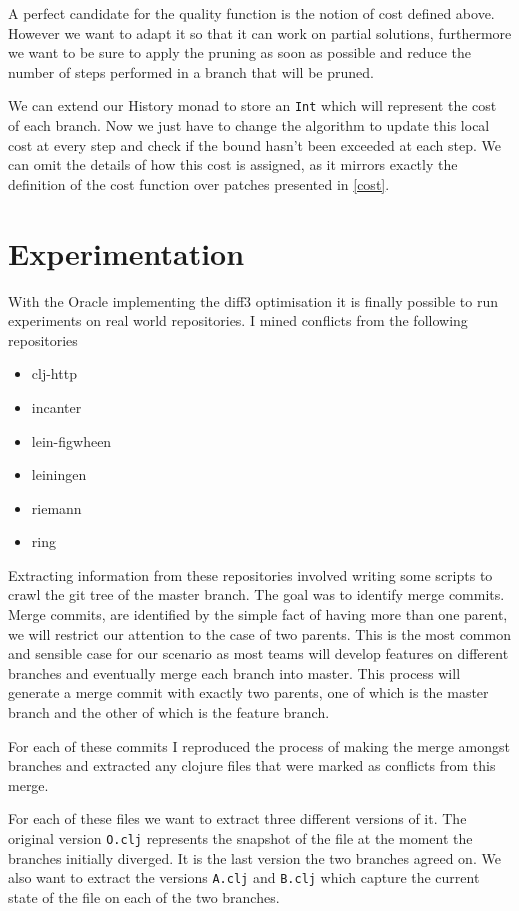 \documentclass[11pt]{article}
\begin{document}
A perfect candidate for the quality function is the notion of cost defined 
above. However we want to adapt it so that it can work on partial solutions, 
furthermore we want to be sure to apply the pruning as soon as possible and 
reduce the number of steps performed in a branch that will be pruned.

We can extend our History monad to store an \texttt{Int} which will represent 
the cost of each branch. Now we just have to change the algorithm to update this 
local cost at every step and check if the bound hasn't been exceeded at each 
step. We can omit the details of how this cost is assigned, as it mirrors 
exactly the definition of the cost function over patches presented in 
\ref{cost}. 


\section{Experimentation}
With the Oracle implementing the diff3 optimisation it is finally possible to
run experiments on real world repositories. I mined conflicts from the following
repositories
 \begin{itemize}
    \item clj-http
    \item incanter
     \item lein-figwheen
     \item leiningen
     \item riemann
     \item ring
 \end{itemize}

Extracting information from these repositories involved writing some scripts to 
crawl the git tree of the master branch. The goal was to identify merge commits. 
Merge commits, are identified by the simple fact of having more than one parent, we will restrict our attention to
the case of two parents. This is the most common and sensible case for our scenario as most teams will develop
features on different branches and eventually merge each branch into master. 
This process will generate a merge commit with exactly two parents, one of which 
is the master branch and the other of which is the feature branch.

For each of these commits I reproduced the process of making the merge amongst branches and extracted any
clojure files that were marked as conflicts from this merge.

For each of these files we want to extract three different versions of it. The 
original version \texttt{O.clj} represents the snapshot of the file at the moment 
the branches initially diverged. It is the last version the two branches agreed 
on. We also want to extract the versions \texttt{A.clj} and \texttt{B.clj} which 
capture the current state of the file on each of the two branches.
\end{document}

